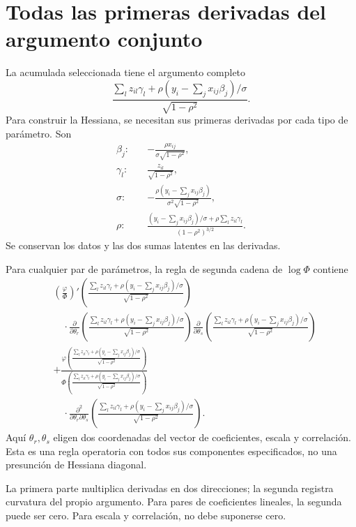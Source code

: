 \documentclass[11pt,a4paper]{article}
\begin{document}
\section{Todas las primeras derivadas del argumento conjunto}\label{unidad147}
La acumulada seleccionada tiene
el argumento completo
\[
\frac{\sum_lz_{il}\gamma_l+
\rho(y_i-\sum_jx_{ij}\beta_j)/\sigma}
{\sqrt{1-\rho^2}}.
\]
Para construir la Hessiana,
se necesitan sus primeras
derivadas por cada tipo
de parámetro. Son
\[
\begin{aligned}
\beta_j:\quad&
-\frac{\rho x_{ij}}{\sigma\sqrt{1-\rho^2}},\\
\gamma_l:\quad&
\frac{z_{il}}{\sqrt{1-\rho^2}},\\
\sigma:\quad&
-\frac{\rho(y_i-\sum_jx_{ij}\beta_j)}
{\sigma^2\sqrt{1-\rho^2}},\\
\rho:\quad&
\frac{(y_i-\sum_jx_{ij}\beta_j)/\sigma+
\rho\sum_lz_{il}\gamma_l}{(1-\rho^2)^{3/2}}.
\end{aligned}
\]
Se conservan los datos
y las dos sumas latentes
en las derivadas.

Para cualquier par de parámetros,
la regla de segunda cadena
de \(\log\Phi\) contiene
\[
\begin{aligned}
&\left(\frac{\varphi}{\Phi}\right)'
\left(\frac{\sum_lz_{il}\gamma_l+\rho(y_i-\sum_jx_{ij}\beta_j)/\sigma}
{\sqrt{1-\rho^2}}\right)\\
&\quad\cdot\frac{\partial}{\partial\theta_r}
\left(\frac{\sum_lz_{il}\gamma_l+\rho(y_i-\sum_jx_{ij}\beta_j)/\sigma}
{\sqrt{1-\rho^2}}\right)
\frac{\partial}{\partial\theta_s}
\left(\frac{\sum_lz_{il}\gamma_l+\rho(y_i-\sum_jx_{ij}\beta_j)/\sigma}
{\sqrt{1-\rho^2}}\right)\\
&+\frac{\varphi\left(\frac{\sum_lz_{il}\gamma_l+\rho(y_i-\sum_jx_{ij}\beta_j)/\sigma}
{\sqrt{1-\rho^2}}\right)}
{\Phi\left(\frac{\sum_lz_{il}\gamma_l+\rho(y_i-\sum_jx_{ij}\beta_j)/\sigma}
{\sqrt{1-\rho^2}}\right)}\\
&\quad\cdot\frac{\partial^2}{\partial\theta_r\partial\theta_s}
\left(\frac{\sum_lz_{il}\gamma_l+\rho(y_i-\sum_jx_{ij}\beta_j)/\sigma}
{\sqrt{1-\rho^2}}\right).
\end{aligned}
\]
Aquí \(\theta_r,\theta_s\) eligen dos coordenadas
del vector de coeficientes, escala y correlación.
Esta es una regla operatoria
con todos sus componentes
especificados, no una
presunción de Hessiana diagonal.

La primera parte multiplica
derivadas en dos direcciones;
la segunda registra curvatura
del propio argumento.
Para pares de coeficientes
lineales, la segunda puede ser cero.
Para escala y correlación,
no debe suponerse cero.
\end{document}
